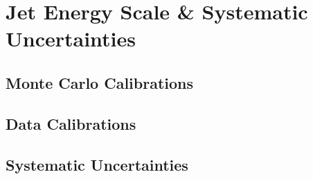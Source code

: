 \chapter{Jet Energy Scale \& Systematic Uncertainties} 

\section{Monte Carlo Calibrations}

\section{Data Calibrations} 

\section{Systematic Uncertainties}  
